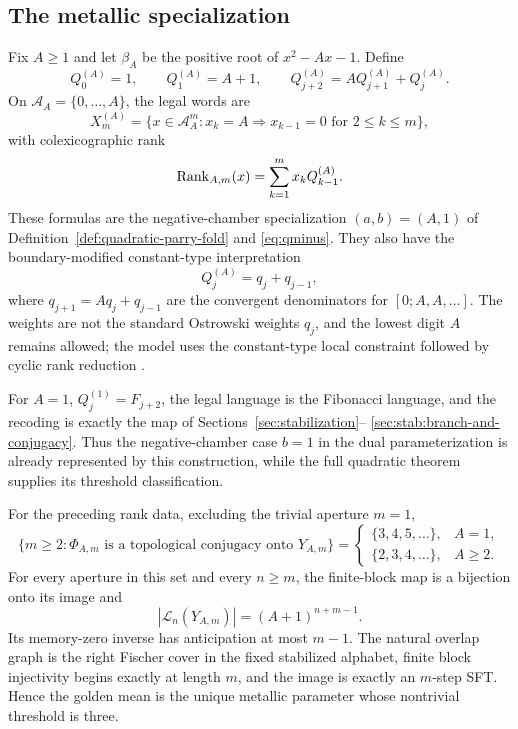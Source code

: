 \subsection{The metallic specialization}
\label{sec:metallic-cover}

Fix $A\ge1$ and let $\beta_A$ be the positive root of $x^2-Ax-1$.  Define
\[
Q_0^{(A)}=1,\qquad Q_1^{(A)}=A+1,
\qquad Q_{j+2}^{(A)}=AQ_{j+1}^{(A)}+Q_j^{(A)}.
\]
On $\mathcal A_A=\{0,\ldots,A\}$, the legal words are
\[
X_m^{(A)}=\{x\in\mathcal A_A^m:
x_k=A\Rightarrow x_{k-1}=0\text{ for }2\le k\le m\},
\]
with colexicographic rank
\[
\operatorname{Rank}_{A,m}(x)=\sum_{k=1}^m x_kQ_{k-1}^{(A)}.
\]
These formulas are the negative-chamber specialization $(a,b)=(A,1)$ of
Definition~\ref{def:quadratic-parry-fold} and
\eqref{eq:qminus}.  They also have the boundary-modified constant-type
interpretation
\[
Q_j^{(A)}=q_j+q_{j-1},
\]
where $q_{j+1}=Aq_j+q_{j-1}$ are the convergent denominators for
$[0;A,A,\ldots]$.  The weights are not the standard Ostrowski weights
$q_j$, and the lowest digit $A$ remains allowed; the model uses the
constant-type local constraint followed by cyclic rank reduction
\cite{HieronymiTerry2018}.

For $A=1$, $Q_j^{(1)}=F_{j+2}$, the legal language is the Fibonacci language,
and the recoding is exactly the map of Sections~\ref{sec:stabilization}--
\ref{sec:stab:branch-and-conjugacy}.  Thus the negative-chamber case $b=1$
in the dual parameterization is already represented by this construction,
while the full quadratic theorem supplies its threshold classification.

\begin{corollary}
\label{cor:metallic-specialization}
For the preceding rank data, excluding the trivial aperture $m=1$,
\[
\{m\ge2:\Phi_{A,m}\text{ is a topological conjugacy onto }Y_{A,m}\}
=
\begin{cases}
\{3,4,5,\ldots\},&A=1,\\
\{2,3,4,\ldots\},&A\ge2.
\end{cases}
\]
For every aperture in this set and every $n\ge m$, the finite-block map is a
bijection onto its image and
\[
|\mathcal L_n(Y_{A,m})|=(A+1)^{n+m-1}.
\]
Its memory-zero inverse has anticipation at most $m-1$.  The natural overlap
graph is the right Fischer cover in the fixed stabilized alphabet, finite
block injectivity begins exactly at length $m$, and the image is exactly an
$m$-step SFT.  Hence the golden mean is the unique metallic parameter whose
nontrivial threshold is three.
\end{corollary}

